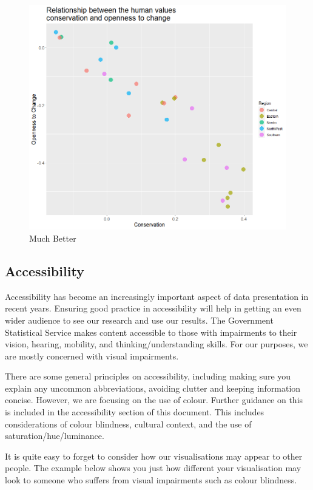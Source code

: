 \documentclass[
  titlepage]{book}
\begin{document}
\begin{figure}
\centering
\includegraphics{img/not too much man.png}
\caption{Much Better}
\end{figure}

\hypertarget{accessibility}{%
\subsection{Accessibility}\label{accessibility}}

Accessibility has become an increasingly important aspect of data presentation in recent years. Ensuring good practice in accessibility will help in getting an even wider audience to see our research and use our results. The Government Statistical Service makes content accessible to those with impairments to their vision, hearing, mobility, and thinking/understanding skills. For our purposes, we are mostly concerned with visual impairments.

There are some general principles on accessibility, including making sure you explain any uncommon abbreviations, avoiding clutter and keeping information concise. However, we are focusing on the use of colour. Further guidance on this is included in the accessibility section of this document. This includes considerations of colour blindness, cultural context, and the use of saturation/hue/luminance.

It is quite easy to forget to consider how our visualisations may appear to other people. The example below shows you just how different your visualisation may look to someone who suffers from visual impairments such as colour blindness.
\end{document}
